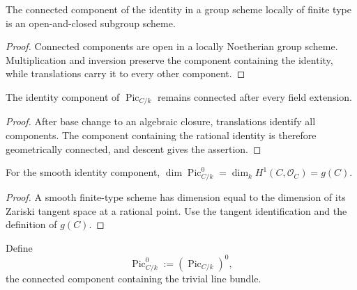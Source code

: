 \begin{lemma}
  \label{pa-lem-identity-component-subgroup}
  \cite{kleiman-picard}
  The connected component of the identity in a group scheme locally of finite
  type is an open-and-closed subgroup scheme.
\end{lemma}

\begin{proof}
  Connected components are open in a locally Noetherian group scheme.
  Multiplication and inversion preserve the component containing the identity,
  while translations carry it to every other component.
\end{proof}

\begin{lemma}
  \label{pa-lem-pic0-geometrically-connected}
  \cite{kleiman-picard}
  The identity component of \(\operatorname{Pic}_{C/k}\) remains connected
  after every field extension.
\end{lemma}

\begin{proof}
  After base change to an algebraic closure, translations identify all
  components.  The component containing the rational identity is therefore
  geometrically connected, and descent gives the assertion.
\end{proof}

\begin{lemma}
  \label{pa-lem-pic0-dimension-tangent}
  \cite{kleiman-picard}
  For the smooth identity component,
  \(\dim\operatorname{Pic}^0_{C/k}=\dim_kH^1(C,\mathcal O_C)=g(C)\).
\end{lemma}

\begin{proof}
  A smooth finite-type scheme has dimension equal to the dimension of its
  Zariski tangent space at a rational point.  Use the tangent identification
  and the definition of \(g(C)\).
\end{proof}

\begin{definition}
  \label{pa-def-pic0}
  \cite[Lem.~5.1]{kleiman-picard}
  Define
  \[
    \operatorname{Pic}^0_{C/k}:=(\operatorname{Pic}_{C/k})^0,
  \]
  the connected component containing the trivial line bundle.
\end{definition}

